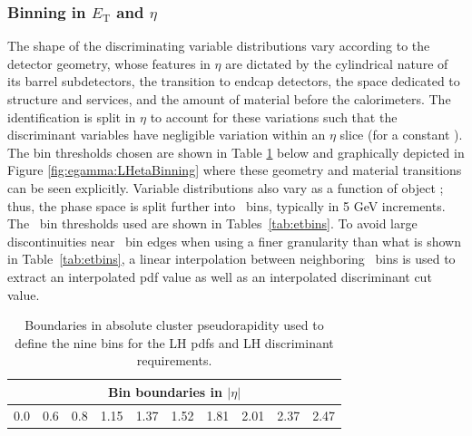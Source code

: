 \subsubsection{Binning in $E_{\mathrm{T}}$ and \(\eta\)}
\label{sec:egamma:pdfbinning}
The shape of the discriminating variable distributions vary according to the detector geometry, whose features in $\eta$ are dictated by the cylindrical nature of its barrel subdetectors, the transition to endcap detectors, the space dedicated to structure and services, and the amount of material before the calorimeters.
The identification is split in $\eta$ to account for these variations such that the discriminant variables have negligible variation within an $\eta$ slice (for a constant \et).
The bin thresholds chosen are shown in Table \ref{tab:etabins} below and graphically depicted in Figure \ref{fig:egamma:LHetaBinning} where these geometry and material transitions can be seen explicitly.
Variable distributions also vary as a function of object \et; thus, the phase space is split further into \et\ bins, typically in 5 GeV increments.
The \et\ bin thresholds used are shown in Tables~\ref{tab:etbins}.
To avoid large discontinuities near \et\ bin edges when using a finer granularity than what is shown in Table~\ref{tab:etbins}, a linear interpolation between neighboring \et\ bins is used to extract an interpolated pdf value as well as an interpolated discriminant cut value.
\begin{table}[h]
\begin{center}
  \begin{tabular}{cccccccccc}
\hline
\multicolumn{10}{c}{Bin boundaries in $|\eta|$}\\
\hline
0.0& 0.6& 0.8& 1.15& 1.37& 1.52& 1.81& 2.01& 2.37& 2.47 \\
\hline
\end{tabular}
\end{center}
\caption[Boundaries in absolute cluster pseudorapidity used to define the nine bins for the LH pdfs and LH discriminant requirements.]{Boundaries in absolute cluster pseudorapidity used to define the nine bins for the LH pdfs and LH discriminant requirements.}
\label{tab:etabins}
\end{table}
